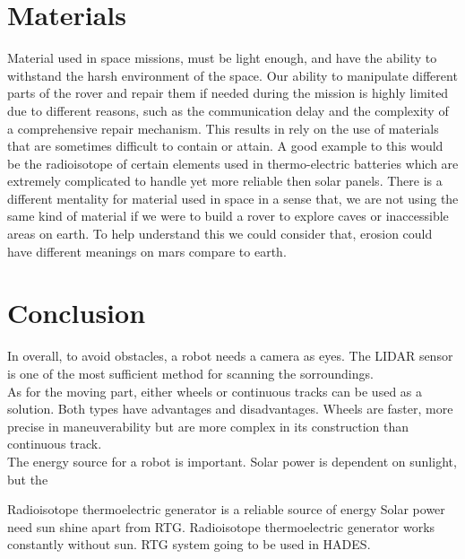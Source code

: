 \section{Materials}

Material used in space missions, must be light enough, and have the ability to withstand the harsh environment of the space.
 Our ability to manipulate different parts of the rover and repair them if needed during the mission is highly limited due to different reasons, such as the communication delay and the complexity of a comprehensive repair mechanism. This results in rely on the use of materials that are sometimes difficult to contain or attain. A good example to this would be the radioisotope of certain elements used in thermo-electric batteries which are extremely complicated to handle yet more reliable then solar panels\cite{NuclearPower}. 
 There is a different mentality for material used in space in a sense that, we are not using the same kind of material if we were to build a rover to explore caves or inaccessible areas on earth. To help understand this we could consider that, erosion could have different meanings on mars compare to earth.


\section{Conclusion}
In overall, to avoid obstacles, a robot needs a camera as eyes. The LIDAR sensor is one of the most sufficient method for scanning the sorroundings.\\
As for the moving part, either wheels or continuous tracks can be used as a solution. Both types have advantages and disadvantages. Wheels are faster, more precise in maneuverability but are more complex in its construction than continuous track.\\
The energy source for a robot is important. Solar power is dependent on sunlight, but the 


Radioisotope thermoelectric generator is a reliable source of energy Solar power need sun shine apart from RTG. Radioisotope thermoelectric generator works constantly without sun. RTG system going to be used in HADES.

